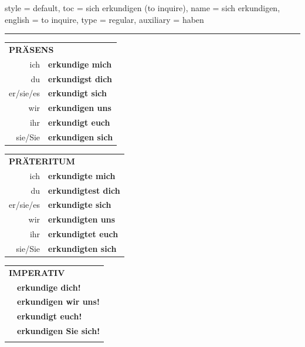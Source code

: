 \begin{verbentry}{
  style = {default},
  toc = {sich erkundigen (to inquire)},
  name = {sich erkundigen},
  english = {to inquire},
  type = {regular},
  auxiliary = {haben}
}
 
    
     \vspace{5pt}

    \hrule
    
    \vspace{5pt}

  \begin{tabular}{rl}
     \multicolumn{2}{l}{\textbf{PRÄSENS} }\\
    ich & \textbf{erkundige mich}\\
    du & \textbf{erkundigst dich}\\
    er/sie/es & \textbf{erkundigt sich}\\
    wir & \textbf{erkundigen uns}\\
    ihr & \textbf{erkundigt euch}\\
    sie/Sie & \textbf{erkundigen sich}\\
  \end{tabular}
  \hfill
     \begin{tabular}{rl}
    \multicolumn{2}{l}{\textbf{PRÄTERITUM} }\\
    ich & \textbf{erkundigte mich}\\
    du & \textbf{erkundigtest dich}\\
    er/sie/es & \textbf{erkundigte sich}\\
    wir & \textbf{erkundigten uns}\\
    ihr & \textbf{erkundigtet euch}\\
    sie/Sie & \textbf{erkundigten sich}\\
  \end{tabular}
  \hfill
  \begin{tabular}{rl}
     \multicolumn{2}{l}{\textbf{IMPERATIV} }\\
   & \textbf{erkundige dich!}\\
   & \textbf{erkundigen wir uns!}\\
   & \textbf{erkundigt euch!}\\
   & \textbf{erkundigen Sie sich!}\\
   & \vspace{10pt}
  \end{tabular}

    \vspace{10pt}


\end{verbentry}
